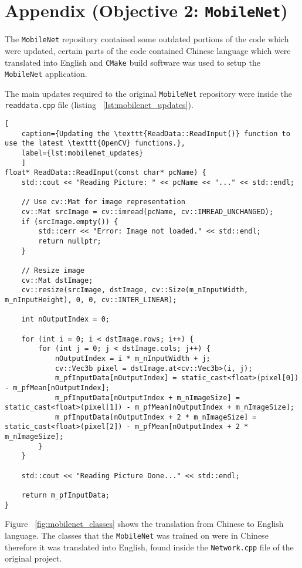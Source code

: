 \newpage
\section{Appendix (Objective 2: \texttt{MobileNet})}

The \texttt{MobileNet} repository\cite{mobilenet_repo} contained some outdated portions of the code which were updated, certain parts of the code contained Chinese language which were translated into English and \texttt{CMake} build software was used to setup the \texttt{MobileNet} application. 

The main updates required to the original \texttt{MobileNet} repository\cite{mobilenet_repo} were inside the \texttt{readdata.cpp} file (listing ~\ref{lst:mobilenet_updates}). 

\begin{lstlisting}[
	caption={Updating the \texttt{ReadData::ReadInput()} function to use the latest \texttt{OpenCV} functions.},
	label={lst:mobilenet_updates}
	]
float* ReadData::ReadInput(const char* pcName) {
	std::cout << "Reading Picture: " << pcName << "..." << std::endl;
	
	// Use cv::Mat for image representation
	cv::Mat srcImage = cv::imread(pcName, cv::IMREAD_UNCHANGED);
	if (srcImage.empty()) {
		std::cerr << "Error: Image not loaded." << std::endl;
		return nullptr;
	}
	
	// Resize image
	cv::Mat dstImage;
	cv::resize(srcImage, dstImage, cv::Size(m_nInputWidth, m_nInputHeight), 0, 0, cv::INTER_LINEAR);
	
	int nOutputIndex = 0;
	
	for (int i = 0; i < dstImage.rows; i++) {
		for (int j = 0; j < dstImage.cols; j++) {
			nOutputIndex = i * m_nInputWidth + j;
			cv::Vec3b pixel = dstImage.at<cv::Vec3b>(i, j);
			m_pfInputData[nOutputIndex] = static_cast<float>(pixel[0]) - m_pfMean[nOutputIndex];
			m_pfInputData[nOutputIndex + m_nImageSize] = static_cast<float>(pixel[1]) - m_pfMean[nOutputIndex + m_nImageSize];
			m_pfInputData[nOutputIndex + 2 * m_nImageSize] = static_cast<float>(pixel[2]) - m_pfMean[nOutputIndex + 2 * m_nImageSize];
		}
	}
	
	std::cout << "Reading Picture Done..." << std::endl;
	
	return m_pfInputData;
}
\end{lstlisting}

Figure ~\ref{fig:mobilenet_classes} shows the translation from Chinese to English language. The classes that the \texttt{MobileNet} was trained on were in Chinese therefore it was translated into English, found inside the \texttt{Network.cpp} file of the original project\cite{mobilenet_repo}. 

